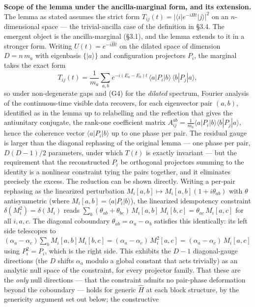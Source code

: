 \documentclass[
]{article}
\begin{document}
\textbf{Scope of the lemma under the ancilla-marginal form, and its
extension.} The lemma as stated assumes the strict form
\(T_{ij}(t) = |\langle i|e^{-iHt}|j\rangle|^2\) on an \(n\)-dimensional
space --- the trivial-ancilla case of the definition in §3.4. The
emergent object is the ancilla-marginal (§3.1), and the lemma extends to
it in a stronger form. Writing \(U(t) = e^{-i\hat H t}\) on the dilated
space of dimension \(D = n\,m_a\) with eigenbasis \(\{|a\rangle\}\) and
configuration projectors \(P_i\), the marginal takes the exact form
\[T_{ij}(t) = \frac{1}{m_a}\sum_{a,b} e^{-i(E_a - E_b)t}\,\langle a|P_i|b\rangle\,\langle b|P_j|a\rangle,\]
so under non-degenerate gaps and (G4) for the \emph{dilated} spectrum,
Fourier analysis of the continuous-time visible data recovers, for each
eigenvector pair \((a,b)\), identified as in the lemma up to relabelling
and the reflection that gives the antiunitary conjugate, the rank-one
coefficient matrix
\(A^{ab}_{ij} = \tfrac{1}{m_a}\langle a|P_i|b\rangle\langle b|P_j|a\rangle\),
hence the coherence vector \(\langle a|P_i|b\rangle\) up to one phase
per pair. The residual gauge is larger than the diagonal rephasing of
the original lemma --- one phase per pair, \(D(D-1)/2\) parameters,
under which \(T(t)\) is exactly invariant --- but the requirement that
the reconstructed \(P_i\) be orthogonal projectors summing to the
identity is a nonlinear constraint tying the pairs together, and it
eliminates precisely the excess. The reduction can be shown directly.
Writing a per-pair rephasing as the linearized perturbation
\(M_i[a,b] \mapsto M_i[a,b](1 + i\theta_{ab})\) with \(\theta\)
antisymmetric (where \(M_i[a,b] = \langle a|P_i|b\rangle\)), the
linearized idempotency constraint \(\delta(M_i^2) = \delta(M_i)\) reads
\(\sum_b (\theta_{ab} + \theta_{bc})\,M_i[a,b]\,M_i[b,c] = \theta_{ac}\,M_i[a,c]\)
for all \(i, a, c\). The diagonal coboundary
\(\theta_{ab} = \alpha_a - \alpha_b\) satisfies this identically: its
left side telescopes to
\((\alpha_a - \alpha_c)\sum_b M_i[a,b]M_i[b,c] = (\alpha_a - \alpha_c)\,M_i^2[a,c] = (\alpha_a - \alpha_c)\,M_i[a,c]\)
using \(P_i^2 = P_i\), which is the right side. This exhibits the
\(D-1\) diagonal-gauge directions (the \(D\) shifts \(\alpha_a\) modulo
a global constant that acts trivially) as an analytic null space of the
constraint, for every projector family. That these are the \emph{only}
null directions --- that the constraint admits no pair-phase deformation
beyond the coboundary --- holds for generic \(\hat H\) at each block
structure, by the genericity argument set out below; the constructive
\end{document}
